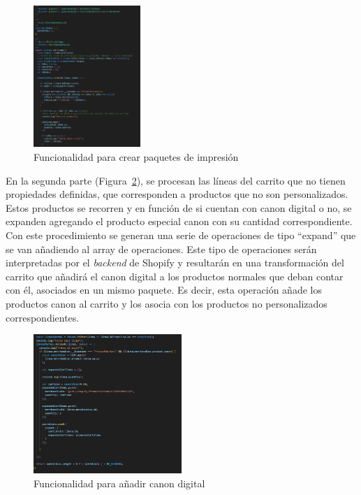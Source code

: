\documentclass[11pt]{article}
\begin{document}
\begin{figure}[H]
    \centering
    \includegraphics[width=0.36\textwidth]{imagenes-tema/primeraParteFunction.png}
    \caption{\label{fig:runpart1} Funcionalidad para crear paquetes de impresión} 
    \vspace{\fill}
\end{figure}

En la segunda parte (Figura~\ref{fig:runpart2}), se procesan las líneas del carrito que no tienen propiedades definidas, que corresponden a productos que no son personalizados. Estos productos se recorren y en función de si cuentan con canon digital o no, se expanden agregando 
el producto especial canon con su cantidad correspondiente. Con este procedimiento se generan una serie de operaciones de tipo ``expand'' que se van añadiendo al array de operaciones. Este tipo de operaciones
serán interpretadas por el \textit{backend} de Shopify y resultarán en una transformación del carrito que añadirá el canon digital a los productos normales que deban contar con él, asociados en un mismo paquete. Es decir, esta operación añade los productos canon al carrito
y los asocia con los productos no personalizados correspondientes.


\begin{figure}[H]
    \centering
    \includegraphics[width=0.5\textwidth]{imagenes-tema/segundaParteFunction.png}
    \caption{\label{fig:runpart2} Funcionalidad para añadir canon digital} 
    \vspace{\fill}
\end{figure}
\end{document}
